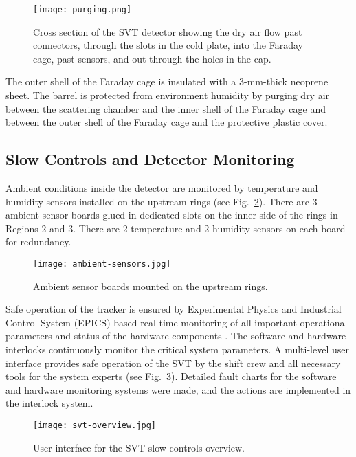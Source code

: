 \begin{figure}[hbt] 
\centering 
\texttt{[image: purging.png]}
\caption{Cross section of the SVT detector showing the dry air flow past connectors, through the slots in the cold plate, into the Faraday cage, past sensors, and out through the holes in the cap.}
\label{fig:purging}
\end{figure}

The outer shell of the Faraday cage is insulated with a 3-mm-thick neoprene sheet. The barrel is protected from environment humidity by purging dry air between the scattering chamber and the inner shell of the Faraday cage and between the outer shell of the Faraday cage and the protective plastic cover. 

\subsection{Slow Controls and Detector Monitoring}

Ambient conditions inside the detector are monitored by temperature and humidity sensors installed on the upstream rings (see Fig.~\ref{fig:ambient-sensors}). There are 3 ambient sensor boards glued in dedicated slots on the inner side of the rings in Regions 2 and 3. There are 2 temperature and 2 humidity sensors on each board for redundancy. 

\begin{figure}[hbt] 
\centering 
\texttt{[image: ambient-sensors.jpg]}
\caption{Ambient sensor boards mounted on the upstream rings.}
\label{fig:ambient-sensors}
\end{figure}

Safe operation of the tracker is ensured by Experimental Physics and Industrial Control System (EPICS)-based real-time monitoring of all important operational parameters and status of the hardware components \cite{EPICS}. The software and hardware interlocks continuously monitor the critical system parameters. A multi-level user interface provides safe operation of the SVT by the shift crew and all necessary tools for the system experts (see Fig.~\ref{fig:svt-overview}). Detailed fault charts for the software and hardware monitoring systems were made, and the actions are implemented in the interlock system.

\begin{figure}[hbt] 
\centering 
\texttt{[image: svt-overview.jpg]}
\caption{User interface for the SVT slow controls overview.}
\label{fig:svt-overview}
\end{figure}

